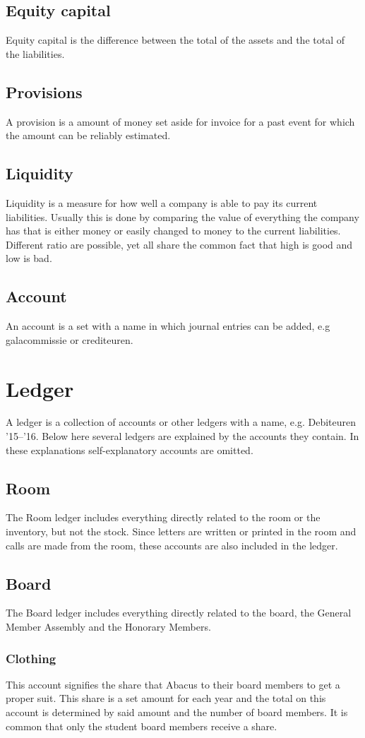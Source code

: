 \documentclass{report}
\begin{document}
\subsection{Equity capital}
Equity capital is the difference between the total of the assets and the total of the liabilities.
\subsection{Provisions}
A provision is a amount of money set aside for invoice for a past event for which the amount can be reliably estimated.
\subsection{Liquidity}
Liquidity is a measure for how well a company is able to pay its current liabilities. Usually this is done by comparing the value of everything the company has that is either money or easily changed to money to the current liabilities. Different ratio are possible, yet all share the common fact that high is good and low is bad.
\subsection{Account}
An account is a set with a name in which journal entries can be added, e.g galacommissie or crediteuren.
\section{Ledger}
A ledger is a collection of accounts or other ledgers with a name, e.g. Debiteuren '15--'16. Below here several ledgers are explained by the accounts they contain. In these explanations self-explanatory accounts are omitted.
\subsection{Room}
The Room ledger includes everything directly related to the room or the inventory, but not the stock. Since letters are written or printed in the room and calls are made from the room, these accounts are also included in the ledger. 
\subsection{Board}
The Board ledger includes everything directly related to the board, the General Member Assembly and the Honorary Members. 
\subsubsection{Clothing}
This account signifies the share that Abacus to their board members to get a proper suit. This share is a set amount for each year and the total on this account is determined by said amount and the number of board members. It is common that only the student board members receive a share.
\end{document}
